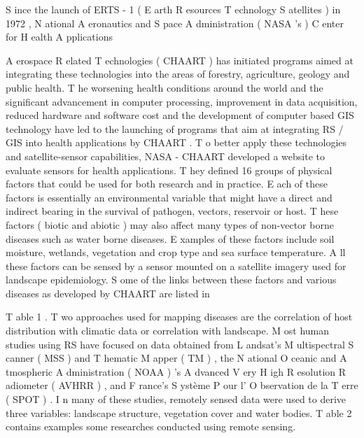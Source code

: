 S ince the launch of ERTS - 1 ( E arth R esources T echnology
S atellites ) in 1972 , N ational A eronautics and S pace
A dministration ( NASA ’s ) C enter for H ealth A pplications



A erospace R elated T echnologies ( CHAART ) has initiated
programs aimed at integrating these technologies into the
areas of forestry, agriculture, geology and public health.
T he worsening health conditions around the world and
the significant advancement in computer processing,
improvement in data acquisition, reduced hardware and
software cost and the development of computer based GIS
technology have led to the launching of programs that aim at
integrating RS / GIS into health applications by CHAART .
T o better apply these technologies and satellite-sensor
capabilities, NASA - CHAART developed a website to
evaluate sensors for health applications. T hey defined
16 groups of physical factors that could be used for both
research and in practice. E ach of these factors is essentially
an environmental variable that might have a direct and
indirect bearing in the survival of pathogen, vectors,
reservoir or host. T hese factors ( biotic and abiotic ) may
also affect many types of non-vector borne diseases such
as water borne diseases. E xamples of these factors include
soil moisture, wetlands, vegetation and crop type and sea
surface temperature. A ll these factors can be sensed by a
sensor mounted on a satellite imagery used for landscape
epidemiology. S ome of the links between these factors and
various diseases as developed by CHAART are listed in

T able 1 .
T wo approaches used for mapping diseases are the
correlation of host distribution with climatic data or
correlation with landscape. M ost human studies using RS
have focused on data obtained from L andsat’s M ultispectral
S canner ( MSS ) and T hematic M apper ( TM ) , the N ational
O ceanic and A tmospheric A dministration ( NOAA ) ’s
A dvanced V ery H igh R esolution R adiometer ( AVHRR ) , and
F rance’s S ystème P our l’ O bservation de la T erre ( SPOT ) .
I n many of these studies, remotely sensed data were used
to derive three variables: landscape structure, vegetation
cover and water bodies. T able 2 contains examples some
researches conducted using remote sensing.













